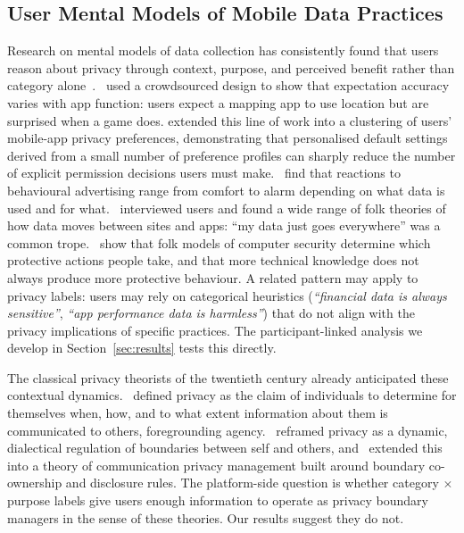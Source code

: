 \documentclass[11pt,a4paper]{article}
\begin{document}
\subsection{User Mental Models of Mobile Data Practices}
\label{subsec:rw-mental-models}

Research on mental models of data collection has consistently found that
users reason about privacy through context, purpose, and perceived
benefit rather than category alone~\citep{lin:etal:2012,lin:etal:2014,
ur:etal:2012,kang:etal:2015}.~\citet{lin:etal:2012} used a crowdsourced design to show
that expectation accuracy varies with app function: users expect a
mapping app to use location but are surprised when a game does.
\citet{lin:etal:2014} extended this line of work into a clustering of
users' mobile-app privacy preferences, demonstrating that personalised
default settings derived from a small number of preference profiles
can sharply reduce the number of explicit permission decisions users
must make.~\citet{ur:etal:2012} find that reactions to behavioural
advertising range from comfort to alarm depending on what data is used
and for what.~\citet{kang:etal:2015} interviewed users and found a wide
range of folk theories of how data moves between sites and apps:
``my data just goes everywhere'' was a common
trope.~\citet{wash:2010,wash:rader:2015} show that folk models of
computer security determine which protective actions people take, and
that more technical knowledge does not always produce more protective
behaviour. A related pattern may apply to privacy labels: users may rely
on categorical heuristics (\emph{``financial data is always sensitive''},
\emph{``app performance data is harmless''}) that do not align with the
privacy implications of specific practices. The participant-linked
analysis we develop in Section~\ref{sec:results} tests this directly.

The classical privacy theorists of the twentieth century already
anticipated these contextual dynamics.~\citet{westin:1967} defined
privacy as the claim of individuals to determine for themselves when,
how, and to what extent information about them is communicated to
others, foregrounding agency.~\citet{altman:1975} reframed privacy as a
dynamic, dialectical regulation of boundaries between self and others,
and~\citet{petronio:2002} extended this into a theory of communication
privacy management built around boundary co-ownership and disclosure
rules. The platform-side question is whether category $\times$ purpose
labels give users enough information to operate as privacy boundary
managers in the sense of these theories. Our results suggest they do not.
\end{document}
